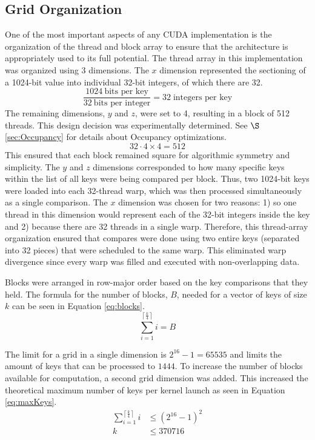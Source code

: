 \documentclass[12pt]{ucthesis}
\begin{document}
\subsection{Grid Organization}
\label{sec:GridOrg}
One of the most important aspects of any CUDA implementation is the 
organization of the thread and block array to ensure that the architecture is 
appropriately used to its full potential. The thread array in this 
implementation was organized using 3 dimensions. The $x$ dimension represented 
the sectioning of a 1024-bit value into individual 32-bit integers, of which 
there are 32. 
\begin{displaymath}
   \frac{1024 \:\mbox{bits per key}}{32 \:\mbox{bits per integer}} = 
   32 \;\mbox{integers per key}
\end{displaymath}
The remaining dimensions, $y$ and $z$, were set to 4, resulting in a block of 
512 threads. This design decision was experimentally determined. See 
$\S$\ref{sec:Occupancy} for details about Occupancy optimizations.
\begin{displaymath}
   32 \cdot 4 \times 4 = 512
\end{displaymath}
This ensured that each block remained square for algorithmic 
symmetry and simplicity. The $y$ and $z$ dimensions corresponded to how many 
specific keys within the list of all keys were being compared per block. 
Thus, two 1024-bit keys were loaded into each 32-thread warp, which was 
then processed simultaneously as a single comparison. The $x$ dimension was 
chosen for two reasons: 1) so one thread in this dimension would represent 
each of the 32-bit integers inside the key and 2) because there are 32 threads 
in a single warp. Therefore, this thread-array organization ensured that 
compares were done using two entire keys (separated into 32 pieces) that were 
scheduled to the same warp. This eliminated warp divergence since every warp 
was filled and executed with non-overlapping data.

Blocks were arranged in row-major order based on the key comparisons that they 
held. The formula for the number of blocks, $B$, needed for a vector of keys of 
size $k$ can be seen in Equation \ref{eq:blocks}.
\begin{equation}
   \sum_{i=1}^{\left\lceil \frac{k}{4} \right\rceil}i = B
   \label{eq:blocks}
\end{equation}

The limit for a grid in a single dimension is $2^{16} - 1 = 65535$ 
and limits the amount of keys that can be processed to $1444$. To increase 
the number of blocks available for computation, a second grid dimension was 
added. This increased the theoretical maximum number of keys per kernel 
launch as seen in Equation \ref{eq:maxKeys}.
\begin{equation}
   \begin{split}
   \sum_{i = 1}^{\left\lceil\frac{k}{4}\right\rceil} i & \leq {\left(2^{16} - 
   1\right)}^2\\
   k & \leq 370716\\
   \end{split}
   \label{eq:maxKeys}
\end{equation}
\end{document}
